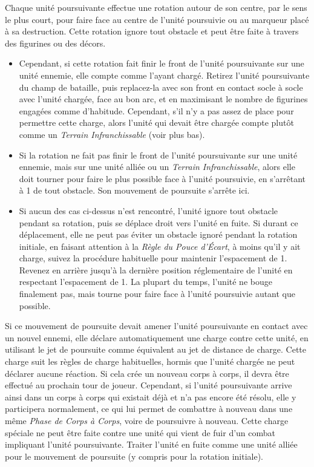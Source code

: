 Chaque unité poursuivante effectue une rotation autour de son centre, par le sens le plus court, pour faire face au centre de l'unité poursuivie ou au marqueur placé à sa destruction. Cette rotation ignore tout obstacle et peut être faite à travers des figurines ou des décors.
\begin{itemize}[label={-}]
\item Cependant, si cette rotation fait finir le front de l'unité poursuivante sur une unité ennemie, elle compte comme l'ayant chargé. Retirez l'unité poursuivante du champ de bataille, puis replacez-la avec son front en contact socle à socle avec l'unité chargée, face au bon arc, et en maximisant le nombre de figurines engagées comme d'habitude. Cependant, s'il n'y a pas assez de place pour permettre cette charge, alors l'unité qui devait être chargée compte plutôt comme un \emph{Terrain Infranchissable} (voir plus bas).
\item Si la rotation ne fait pas finir le front de l'unité poursuivante sur une unité ennemie, mais sur une unité alliée ou un \emph{Terrain Infranchissable}, alors elle doit tourner pour faire le plus possible face à l'unité poursuivie, en s'arrêtant à 1{\pouce} de tout obstacle. Son mouvement de poursuite s'arrête ici.
\item Si aucun des cas ci-dessus n'est rencontré, l'unité ignore tout obstacle pendant sa rotation, puis se déplace droit vers l'unité en fuite. Si durant ce déplacement, elle ne peut pas éviter un obstacle ignoré pendant la rotation initiale, en faisant attention à la \emph{Règle du Pouce d'Écart}, à moins qu'il y ait charge, suivez la procédure habituelle pour maintenir l'espacement de 1{\pouce}. Revenez en arrière jusqu'à la dernière position réglementaire de l'unité en respectant l'espacement de 1{\pouce}. La plupart du temps, l'unité ne bouge finalement pas, mais tourne pour faire face à l'unité poursuivie autant que possible.
\end{itemize}

Si ce mouvement de poursuite devait amener l'unité poursuivante en contact avec un nouvel ennemi, elle déclare automatiquement une charge contre cette unité, en utilisant le jet de poursuite comme équivalent au jet de distance de charge. Cette charge suit les règles de charge habituelles, hormis que l'unité chargée ne peut déclarer aucune réaction. Si cela crée un nouveau corps à corps, il devra être effectué au prochain tour de joueur. Cependant, si l'unité poursuivante arrive ainsi dans un corps à corps qui existait déjà et n'a pas encore été résolu, elle y participera normalement, ce qui lui permet de combattre à nouveau dans une même \emph{Phase de Corps à Corps}, voire de poursuivre à nouveau. Cette charge spéciale ne peut être faite contre une unité qui vient de fuir d'un combat impliquant l'unité poursuivante. Traiter l'unité en fuite comme une unité alliée pour le mouvement de poursuite (y compris pour la rotation initiale).

